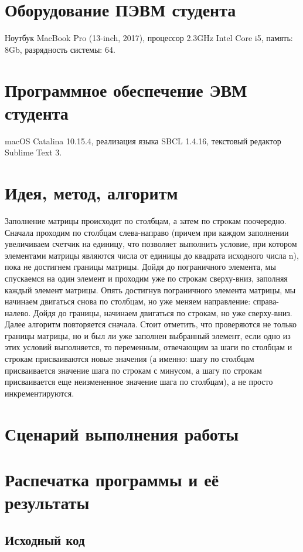 \documentclass[12pt]{article}
\begin{document}
\section{Оборудование ПЭВМ студента}
Ноутбук MacBook Pro (13-inch, 2017), процессор 2.3GHz Intel Core i5, память: 8Gb, разрядность системы: 64.

\section{Программное обеспечение ЭВМ студента}
macOS Catalina 10.15.4, реализация языка SBCL 1.4.16, текстовый редактор Sublime Text 3.

\section{Идея, метод, алгоритм}

Заполнение матрицы происходит по столбцам, а затем по строкам поочередно. Сначала проходим по столбцам слева-направо (причем при каждом заполнении увеличиваем счетчик на единицу, что позволяет выполнить условие, при котором элементами матрицы являются числа от единицы до квадрата исходного числа n), пока не достигнем границы матрицы. Дойдя до пограничного элемента, мы спускаемся на один элемент и проходим уже по строкам сверху-вниз, заполняя каждый элемент матрицы. Опять достигнув пограничного элемента матрицы, мы начинаем двигаться снова по столбцам, но уже меняем направление: справа-налево. Дойдя до границы, начинаем двигаться по строкам, но уже сверху-вниз. Далее алгоритм повторяется сначала. Стоит отметить, что проверяются не только границы матрицы, но и был ли уже заполнен выбранный элемент, если одно из этих условий выполняется, то переменным, отвечающим за шаги по столбцам и строкам присваиваются новые значения (а именно: шагу по столбцам присваивается значение шага по строкам с минусом, а шагу по строкам присваивается еще неизмененное значение шага по столбцам), а не просто инкрементируются.

\section{Сценарий выполнения работы}

\section{Распечатка программы и её результаты}

\subsection{Исходный код}

\end{document}
